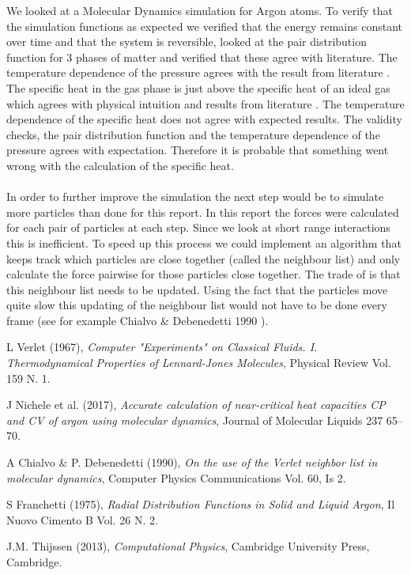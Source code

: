 \documentclass[10 pt, a4paper]{article}
\begin{document}
We looked at a Molecular Dynamics simulation for Argon atoms. To verify that the simulation functions as expected we verified that the energy remains constant over time and that the system is reversible, looked at the pair distribution function for 3 phases of matter and verified that these agree with literature.  The temperature dependence of the pressure agrees with the result from literature \cite{obser}. The specific heat in the gas phase is just above the specific heat of an ideal gas which agrees with physical intuition and results from literature \cite{obser}. The temperature dependence of the specific heat does not agree with expected results. The validity checks, the pair distribution function and the temperature dependence of the pressure agrees with expectation. Therefore it is probable that something went wrong with the calculation of the specific heat.
\\
\\
In order to further improve the simulation the next step would be to simulate more particles than done for this report. In this report the forces were calculated for each pair of particles at each step. Since we look at short range interactions this is inefficient. To speed up this process we could implement an algorithm that keeps track which particles are close together (called the neighbour list) and only calculate the force pairwise for those particles close together. The trade of is that this neighbour list needs to be updated. Using the fact that the particles move quite slow this updating of the neighbour list would not have to be done every frame (see for example Chialvo \& Debenedetti 1990 \cite{neighbour}).

\begin{thebibliography}{99}
 L Verlet (1967), \textit{Computer "Experiments" on Classical Fluids. I. Thermodynamical Properties of Lennard-Jones Molecules}, Physical Review Vol. 159 N. 1.

 J Nichele et al. (2017), \textit{Accurate calculation of near-critical heat capacities CP and CV of argon using molecular dynamics}, Journal of Molecular Liquids 237 65–70.

 A Chialvo \& P. Debenedetti (1990), \textit{On the use of the Verlet neighbor list in molecular dynamics}, Computer Physics Communications Vol. 60, Is 2.

 S Franchetti (1975), \textit{Radial Distribution Functions in Solid and Liquid Argon}, Il Nuovo Cimento B Vol. 26 N. 2.

 J.M. Thijssen (2013), \textit{Computational Physics}, Cambridge University Press, Cambridge.

\end{thebibliography}
\end{document}

